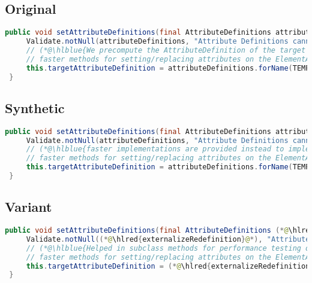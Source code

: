 \documentclass[11pt]{article}
\DeclareRobustCommand{\hlred}[1]{{\sethlcolor{YellowOrange}\hl{#1}}}
\DeclareRobustCommand{\hlblue}[1]{{\sethlcolor{SeaGreen}\hl{#1}}}
\DeclareRobustCommand{\hlblue}[1]{{\sethlcolor{SkyBlue}\hl{#1}}}
\begin{document}
\subsection{Original}
\begin{lstlisting}[language=java]
 public void setAttributeDefinitions(final AttributeDefinitions attributeDefinitions) {
     Validate.notNull(attributeDefinitions, "Attribute Definitions cannot be null");
     // (*@\hlblue{We precompute the AttributeDefinition of the target attribute in order to being able to use much}@*)
     // faster methods for setting/replacing attributes on the ElementAttributes implementation
     this.targetAttributeDefinition = attributeDefinitions.forName(TEMPLATE_MODE, TARGET_ATTR_NAME);
 }
\end{lstlisting}
\subsection{Synthetic}

\begin{lstlisting}[language=java]
 public void setAttributeDefinitions(final AttributeDefinitions attributeDefinitions) {
     Validate.notNull(attributeDefinitions, "Attribute Definitions cannot be null");
     // (*@\hlblue{faster implementations are provided instead to implement additional and more sophisticated or intuitive or useful but}@*)
     // faster methods for setting/replacing attributes on the ElementAttributes implementation
     this.targetAttributeDefinition = attributeDefinitions.forName(TEMPLATE_MODE, TARGET_ATTR_NAME);
 }
\end{lstlisting}

\subsection{Variant}

\begin{lstlisting}[language=java]
 public void setAttributeDefinitions(final AttributeDefinitions (*@\hlred{externalizeRedefinition}@*)) {
     Validate.notNull((*@\hlred{externalizeRedefinition}@*), "Attribute Definitions cannot be null");
     // (*@\hlblue{Helped in subclass methods for performance testing or by writing the below comments for adding}@*)
     // faster methods for setting/replacing attributes on the ElementAttributes implementation
     this.targetAttributeDefinition = (*@\hlred{externalizeRedefinition}@*).forName(TEMPLATE_MODE, TARGET_ATTR_NAME);
 }
\end{lstlisting}
\end{document}
